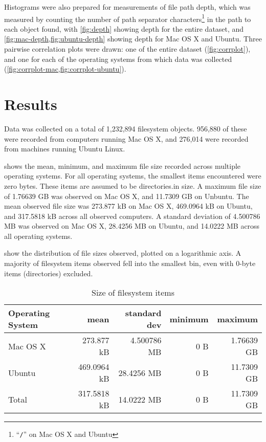 \documentclass[12pt,letterpaper]{article}
\begin{document}
			Histograms were also prepared for measurements of file path depth, which was measured by counting the number of path separator characters\footnote{``\texttt{/}'' on Mac OS X and Ubuntu} in the path to each object found, with \cref{fig:depth} showing depth for the entire dataset, and \cref{fig:mac-depth,fig:ubuntu-depth}  showing depth for Mac OS X and Ubuntu. Three pairwise correlation plots were drawn: one of the entire dataset (\cref{fig:corrplot}), and one for each of the operating systems from which data was collected (\cref{fig:corrplot-mac,fig:corrplot-ubuntu}).

	\section{Results}

		Data was collected on a total of 1,232,894 filesystem objects. 956,880 of these were recorded from computers running Mac OS X, and 276,014 were recorded from machines running Ubuntu Linux.

		 shows the mean, minimum, and maximum file size recorded across multiple operating systems. For all operating systems, the smallest items encountered were zero bytes. These items are assumed to be directories.in size. A maximum file size of 1.76639 GB was observed on Mac OS X, and 11.7309 GB on Unbuntu.  The mean observed file size was 273.877 kB on Mac OS X, 469.0964 kB on Ubuntu, and 317.5818 kB across all observed computers. A standard deviation of 4.500786 MB was observed on Mac OS X, 28.4256 MB on Ubuntu, and 14.0222 MB across all operating systems.

		 show the distribution of file sizes observed, plotted on a logarithmic axis. A majority of filesystem items observed fell into the smallest bin, even with 0-byte items (directories) excluded.

		\begin{table}[h]
		\centering
		\caption{Size of filesystem items}
		\label{table:size}
			\begin{tabular}{l r r r r}
			Operating System & mean  & standard dev & minimum & maximum \\
			\hline
			Mac OS X & 273.877 kB & 4.500786 MB & 0 B & 1.76639 GB \\
			Ubuntu & 469.0964 kB & 28.4256 MB & 0 B & 11.7309 GB \\
			Total  & 317.5818 kB & 14.0222 MB & 0 B & 11.7309 GB \\
			\end{tabular}
		\end{table}
\end{document}

